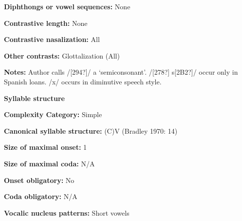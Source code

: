 \begin{styleBody}
\textbf{Diphthongs or vowel sequences:} None
\end{styleBody}

\begin{styleBody}
\textbf{Contrastive length:} None
\end{styleBody}

\begin{styleBody}
\textbf{Contrastive nasalization:} All
\end{styleBody}

\begin{styleBody}
\textbf{Other contrasts: }Glottalization (All)
\end{styleBody}

\begin{styleBody}
\textbf{Notes:} Author calls /[294?]/ a ‘semiconsonant’. /[278?] s[2B2?]/ occur only in Spanish loans. /x/ occurs in diminutive speech style.
\end{styleBody}

\begin{styleBody}
\textbf{Syllable structure}
\end{styleBody}

\begin{styleBody}
\textbf{Complexity Category: }Simple
\end{styleBody}

\begin{styleBody}
\textbf{Canonical syllable structure:} (C)V\textbf{ }(Bradley 1970: 14)
\end{styleBody}

\begin{styleBody}
\textbf{Size of maximal onset:} 1
\end{styleBody}

\begin{styleBody}
\textbf{Size of maximal coda:} N/A
\end{styleBody}

\begin{styleBody}
\textbf{Onset obligatory:} No
\end{styleBody}

\begin{styleBody}
\textbf{Coda obligatory:} N/A
\end{styleBody}

\begin{styleBody}
\textbf{Vocalic nucleus patterns:} Short vowels
\end{styleBody}

